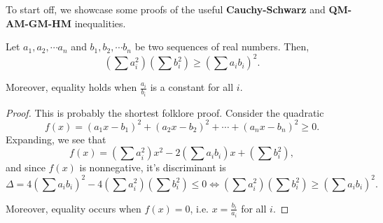 \documentclass[../jarvis.tex]{subfiles}
\begin{document}
To start off, we showcase some proofs of the useful \textbf{Cauchy-Schwarz} and \textbf{QM-AM-GM-HM} inequalities.

\begin{theorem}
    Let $a_1,a_2,\cdots a_n$ and $b_1,b_2,\cdots b_n$ be two sequences of real numbers. Then,
    $$\left(\sum a_i^2\right)\left(\sum b_i^2\right)\geq \left(\sum a_ib_i\right)^2.$$

    Moreover, equality holds when $\frac{a_i}{b_i}$ is a constant for all $i$.
\end{theorem}
\begin{proof}
    This is probably the shortest folklore proof. Consider the quadratic
    $$f(x)=(a_1x-b_1)^2+(a_2x-b_2)^2+\cdots+(a_nx-b_n)^2 \geq 0.$$
    Expanding, we see that
    $$f(x)=\left(\sum a_i^2\right)x^2-2\left(\sum a_ib_i\right)x+\left(\sum b_i^2\right),$$
    and since $f(x)$ is nonnegative,
    it's discriminant is
    $$\Delta=4\left(\sum a_ib_i\right)^2-4\left(\sum a_i^2\right)\left(\sum b_i^2\right)\leq 0 \iff \left(\sum a_i^2\right)\left(\sum b_i^2\right)\geq \left(\sum a_ib_i\right)^2.$$

    Moreover, equality occurs when $f(x)=0$, i.e. $x=\frac{b_i}{a_i}$ for all $i$.
\end{proof}
\end{document}
